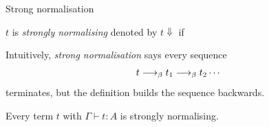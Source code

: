 \begin{frame}{Strong normalisation}
  \begin{definition}
    $t$ is \emph{strongly normalising} denoted by $t \Downarrow$ if 
    \begin{prooftree}
    \end{prooftree}
    
  \end{definition}
  Intuitively, \emph{strong normalisation} says every sequence
    \[
      t \onereduce t_1 \onereduce t_2 \cdots
    \]
  terminates, but the definition builds the sequence backwards. 

  \begin{theorem}
    Every term $t$ with $\Gamma \vdash t : A$ is strongly normalising.
  \end{theorem}
\end{frame}

%
%

%
